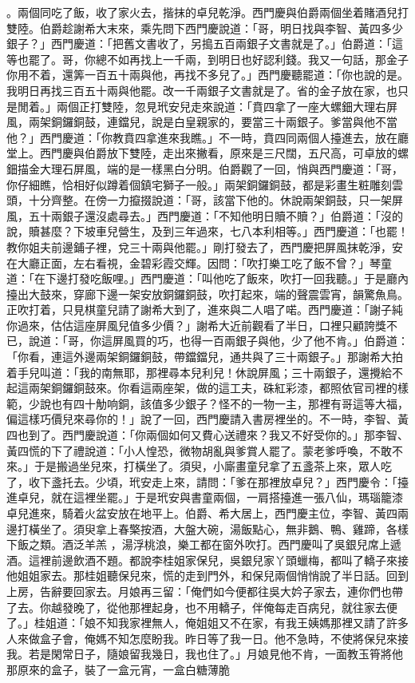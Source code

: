 \begin{showcontents}{}
。兩個同吃了飯，收了家火去，揩抹的卓兒乾淨。西門慶與伯爵兩個坐着賭酒兒打雙陸。伯爵趁謝希大末來，乘先問下西門慶說道：「哥，明日找與李智、黃四多少銀子？」西門慶道：「把舊文書收了，另搗五百兩銀子文書就是了。」伯爵道：「這等也罷了。哥，你總不如再找上一千兩，到明日也好認利錢。我又一句話，那金子你用不着，還筭一百五十兩與他，再找不多兒了。」西門慶聽罷道：「你也說的是。我明日再找三百五十兩與他罷。改一千兩銀子文書就是了。省的金子放在家，也只是閒着。」兩個正打雙陸，忽見玳安兒走來說道：「賁四拿了一座大螺鈿大理右屏風，兩架銅鑼銅鼓，連鐺兒，說是白皇親家的，要當三十兩銀子。爹當與他不當他？」西門慶道：「你教賁四拿進來我瞧。」不一時，賁四同兩個人擡進去，放在廳堂上。西門慶與伯爵放下雙陸，走出來撇看，原來是三尺闊，五尺高，可卓放的螺鈿描金大理石屏風，端的是一樣黑白分明。伯爵觀了一回，悄與西門慶道：「哥，你仔細瞧，恰相好似蹲着個鎮宅獅子一般。」兩架銅鑼銅鼓，都是彩畫生粧雕刻雲頭，十分齊整。在傍一力攛掇說道：「哥，該當下他的。休說兩架銅鼓，只一架屏風，五十兩銀子還沒處尋去。」西門慶道：「不知他明日贖不贖？」伯爵道：「沒的說，贖甚麼？下坡車兒營生，及到三年過來，七八本利相等。」西門慶道：「也罷！教你姐夫前邊鋪子裡，兌三十兩與他罷。」剛打發去了，西門慶把屏風抹乾淨，安在大廳正面，左右看視，金碧彩霞交輝。因問：「吹打樂工吃了飯不曾？」琴童道：「在下邊打發吃飯哩。」西門慶道：「叫他吃了飯來，吹打一回我聽。」于是廳內擡出大鼓來，穿廊下邊一架安放銅鑼銅鼓，吹打起來，端的聲震雲宵，韻驚魚鳥。正吹打着，只見棋童兒請了謝希大到了，進來與二人唱了喏。西門慶道：「謝子純你過來，估估這座屏風兒值多少價？」謝希大近前觀看了半日，口裡只顧誇獎不已，說道：「哥，你這屏風買的巧，也得一百兩銀子與他，少了他不肯。」伯爵道：「你看，連這外邊兩架銅鑼銅鼓，帶鐺鐺兒，通共與了三十兩銀子。」那謝希大拍着手兒叫道：「我的南無耶，那裡尋本兒利兒！休說屏風；三十兩銀子，還攪給不起這兩架銅鑼銅鼓來。你看這兩座架，做的這工夫，硃紅彩漆，都照依官司裡的樣範，少說也有四十觔响銅，該值多少銀子？怪不的一物一主，那裡有哥這等大福，偏這樣巧價兒來尋你的！」說了一回，西門慶請入書房裡坐的。不一時，李智、黃四也到了。西門慶說道：「你兩個如何又費心送禮來？我又不好受你的。」那李智、黃四慌的下了禮說道：「小人惶恐，微物胡亂與爹賞人罷了。蒙老爹呼喚，不敢不來。」于是搬過坐兒來，打橫坐了。須臾，小廝畫童兒拿了五盞茶上來，眾人吃了，收下盞托去。少頃，玳安走上來，請問：「爹在那裡放卓兒？」西門慶令：「擡進卓兒，就在這裡坐罷。」于是玳安與書童兩個，一肩搭擡進一張八仙，瑪瑙籠漆卓兒進來，騎着火盆安放在地平上。伯爵、希大居上，西門慶主位，李智、黃四兩邊打橫坐了。須臾拿上春檠按酒，大盤大碗，湯飯點心，無非鵝、鴨、雞蹄，各樣下飯之類。酒泛羊羔 ，湯浮桃浪，樂工都在窗外吹打。西門慶叫了吳銀兒席上遞酒。這裡前邊飲酒不題。都說李桂姐家保兒，吳銀兒家丫頭蠟梅，都叫了轎子來接他姐姐家去。那桂姐聽保兒來，慌的走到門外，和保兒兩個悄悄說了半日話。回到上房，告辭要回家去。月娘再三留：「俺們如今便都往吳大妗子家去，連你們也帶了去。你越發晚了，從他那裡起身，也不用轎子，伴俺每走百病兒，就往家去便了。」桂姐道：「娘不知我家裡無人，俺姐姐又不在家，有我王姨媽那裡又請了許多人來做盒子會，俺媽不知怎麼盼我。昨日等了我一日。他不急時，不使將保兒來接我。若是閑常日子，隨娘留我幾日，我也住了。」月娘見他不肯，一面教玉筲將他那原來的盒子，裝了一盒元宵，一盒白糖薄脆 
\end{showcontents}
